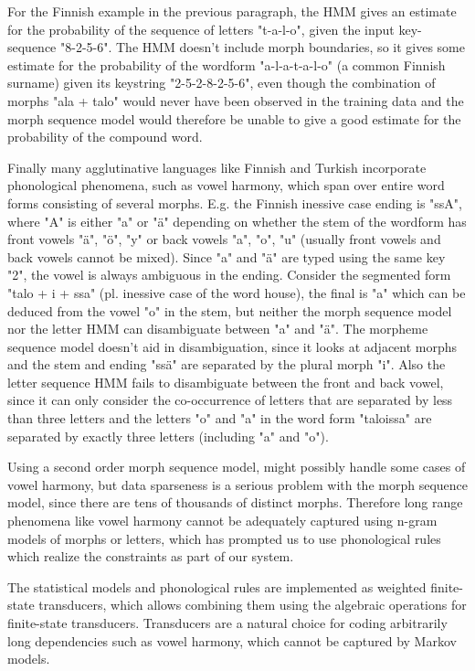 \documentclass{llncs}
\begin{document}
For the Finnish example in the previous paragraph, the HMM gives an
estimate for the probability of the sequence of letters "t-a-l-o",
given the input key-sequence "8-2-5-6". The HMM doesn't include
morph boundaries, so it gives some estimate for the probability of
the wordform "a-l-a-t-a-l-o" (a common Finnish surname) given its keystring
"2-5-2-8-2-5-6", even though the combination of morphs "ala + talo"
would never have been observed in the training data and the morph
sequence model would therefore be unable to give a good estimate for
the probability of the compound word.

Finally many agglutinative languages like Finnish and Turkish
incorporate phonological phenomena, such as vowel harmony, which span
over entire word forms consisting of several morphs. E.g. the Finnish
inessive case ending is "ssA", where "A" is either "a" or "\"{a}"
depending on whether the stem of the wordform has front vowels "ä",
"ö", "y" or back vowels "a", "o", "u" (usually front vowels and back
vowels cannot be mixed). Since "a" and "\"{a}" are typed using the
same key "2", the vowel is always ambiguous in the ending. Consider
the segmented form "talo + i + ssa" (pl. inessive case of the word
house), the final is "a" which can be deduced from the vowel "o" in
the stem, but neither the morph sequence model nor the letter HMM can
disambiguate between "a" and "ä". The morpheme sequence model doesn't
aid in disambiguation, since it looks at adjacent morphs and the stem
and ending "ss\"{a}" are separated by the plural morph "i". Also the
letter sequence HMM fails to disambiguate between the front and back
vowel, since it can only consider the co-occurrence of letters that
are separated by less than three letters and the letters "o" and "a"
in the word form "taloissa" are separated by exactly three letters
(including "a" and "o").

Using a second order morph sequence model, might possibly handle some
cases of vowel harmony, but data sparseness is a serious problem with
the morph sequence model, since there are tens of thousands of
distinct morphs. Therefore long range phenomena like vowel harmony
cannot be adequately captured using n-gram models of morphs or
letters, which has prompted us to use phonological rules which realize
the constraints as part of our system.

The statistical models and phonological rules are implemented as
weighted finite-state transducers, which allows combining them using
the algebraic operations for finite-state transducers. Transducers are
a natural choice for coding arbitrarily long dependencies such as
vowel harmony, which cannot be captured by Markov models.
\end{document}
